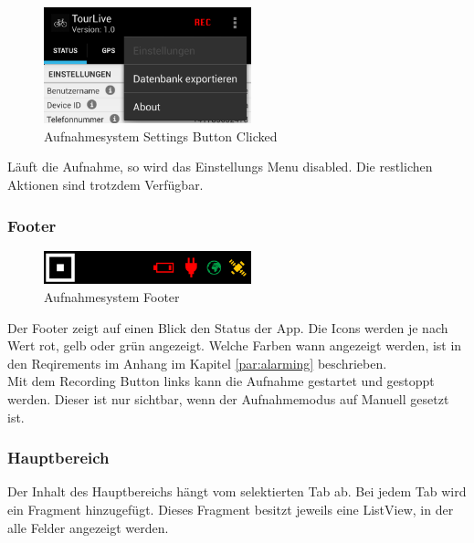 \begin{figure}[H]
	\centering
	\includegraphics[width=60mm]{images/android/settingsclicked.png}
	\caption{Aufnahmesystem Settings Button Clicked}
\end{figure}

Läuft die Aufnahme, so wird das Einstellungs Menu disabled. Die restlichen Aktionen sind trotzdem Verfügbar.


\subsubsection{Footer}
\begin{figure}[H]
	\centering
	\includegraphics[width=60mm]{images/android/footer.png}
	\caption{Aufnahmesystem Footer}
\end{figure}
Der Footer zeigt auf einen Blick den Status der App. Die Icons werden je nach Wert rot, gelb oder grün angezeigt. Welche Farben wann angezeigt werden, ist in den Reqirements im Anhang im Kapitel \ref{par:alarming} beschrieben.\\
Mit dem Recording Button links kann die Aufnahme gestartet und gestoppt werden. Dieser ist nur sichtbar, wenn der Aufnahmemodus auf Manuell gesetzt ist.


\subsubsection{Hauptbereich}
Der Inhalt des Hauptbereichs hängt vom selektierten Tab ab. Bei jedem Tab wird ein Fragment hinzugefügt. Dieses Fragment besitzt jeweils eine ListView, in der alle Felder angezeigt werden. 


